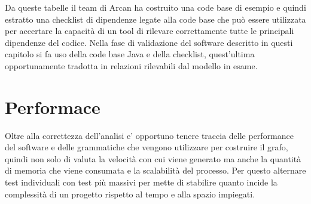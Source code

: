 

Da queste tabelle il team di Arcan ha costruito una code base di esempio e quindi estratto una checklist di dipendenze legate alla code base che pu\`o essere utilizzata per accertare la capacit\`a di un tool di rilevare correttamente tutte le principali dipendenze del codice. Nella fase di validazione del software descritto in questi capitolo si fa uso della code base Java e della checklist, quest'ultima opportunamente tradotta in relazioni rilevabili dal modello in esame.

\section{Performace}

Oltre alla correttezza dell'analisi e' opportuno tenere traccia delle performance del software e delle grammatiche che vengono utilizzare per costruire il grafo, quindi non solo di valuta la velocit\`a con cui viene generato ma anche la quantit\`a di memoria che viene consumata e la scalabilit\`a del processo.
Per questo alternare test individuali con test pi\`u massivi per mette di stabilire quanto incide la complessit\`a di un progetto rispetto al tempo e alla spazio impiegati.
